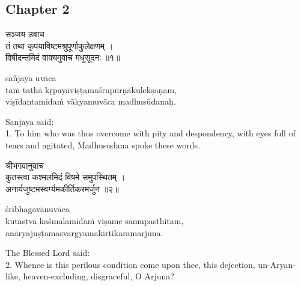 \chapterdrop

\begin{center}

\headerspace
{}

\section{Chapter 2}

\headerspace
{}

\headerspace
{}

\headerspace
{}

\headerspace
\end{center}

\begin{gitaverse}
सञ्जय उवाच \\
तं तथा कृपयाविष्टमश्रुपूर्णाकुलेक्षणम् । \\
विषीदन्तमिदं वाक्यमुवाच मधुसूदनः ॥१॥
\end{gitaverse}

\begin{transliteration}
sañjaya uvāca \\
taṁ tathā kṛpayāviṣṭamaśrupūrṇākulekṣaṇam, \\
viṣīdantamidaṁ vākyamuvāca madhusūdanaḥ.
\end{transliteration}

Sanjaya said: \\
1. To him who was thus overcome with pity and despondency, with eyes full of
tears and agitated, Madhusudana spoke these words.

\begin{gitaverse}
श्रीभगवानुवाच \\
कुतस्त्वा कश्मलमिदं विषमे समुपस्थितम् । \\
अनार्यजुष्टमस्वर्ग्यमकीर्तिकरमर्जुन ॥२॥
\end{gitaverse}

\begin{transliteration}
śrībhagavānuvāca \\
kutastvā kaśmalamidaṁ viṣame samupasthitam, \\
anāryajuṣṭamasvargyamakīrtikaramarjuna.
\end{transliteration}

The Blessed Lord said: \\
2. Whence is this perilous condition come upon thee, this dejection,
un-Aryan-like, heaven-excluding, disgraceful, O Arjuna?

